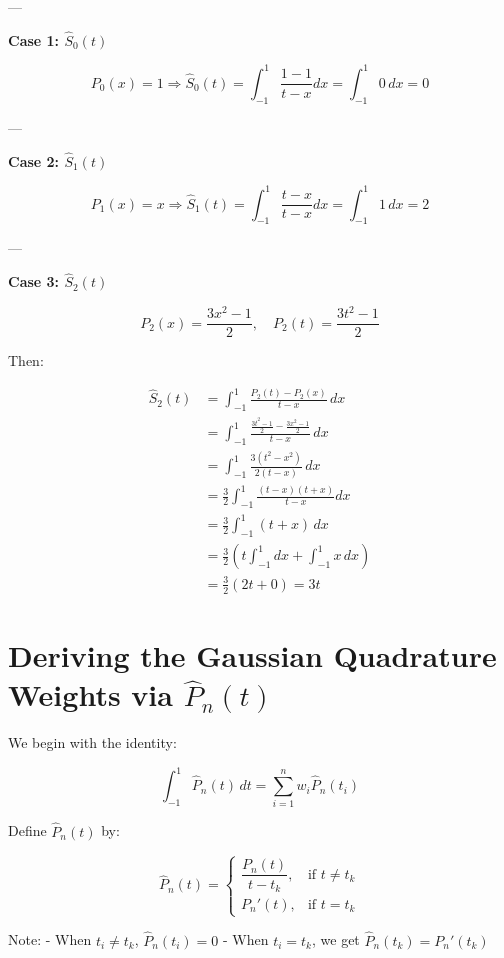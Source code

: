 \documentclass{article}
\begin{document}
---

\textbf{Case 1: \( \hat{S}_0(t) \)}

\[
P_0(x) = 1 \Rightarrow \hat{S}_0(t) = \int_{-1}^{1} \frac{1 - 1}{t - x} dx = \int_{-1}^{1} 0 \, dx = 0
\]

---

\textbf{Case 2: \( \hat{S}_1(t) \)}

\[
P_1(x) = x \Rightarrow \hat{S}_1(t) = \int_{-1}^{1} \frac{t - x}{t - x} dx = \int_{-1}^{1} 1 \, dx = 2
\]

---

\textbf{Case 3: \( \hat{S}_2(t) \)}

\[
P_2(x) = \frac{3x^2 - 1}{2}, \quad
P_2(t) = \frac{3t^2 - 1}{2}
\]

Then:

\begin{align*}
\hat{S}_2(t) &= \int_{-1}^{1} \frac{P_2(t) - P_2(x)}{t - x} \, dx \\
&= \int_{-1}^{1} \frac{ \frac{3t^2 - 1}{2} - \frac{3x^2 - 1}{2} }{t - x} \, dx \\
&= \int_{-1}^{1} \frac{3(t^2 - x^2)}{2(t - x)} \, dx \\
&= \frac{3}{2} \int_{-1}^{1} \frac{(t - x)(t + x)}{t - x} dx \\
&= \frac{3}{2} \int_{-1}^{1} (t + x) \, dx \\
&= \frac{3}{2} \left( t \int_{-1}^{1} dx + \int_{-1}^{1} x \, dx \right) \\
&= \frac{3}{2} (2t + 0) = 3t
\end{align*}


\section*{Deriving the Gaussian Quadrature Weights via $\hat{P}_n(t)$}

We begin with the identity:

\[
\int_{-1}^{1} \hat{P}_n(t) \, dt = \sum_{i=1}^{n} w_i \hat{P}_n(t_i)
\]

Define \( \hat{P}_n(t) \) by:

\[
\hat{P}_n(t) =
\begin{cases}
\dfrac{P_n(t)}{t - t_k}, & \text{if } t \ne t_k \\
P_n'(t), & \text{if } t = t_k
\end{cases}
\]

Note:
- When \( t_i \ne t_k \), \( \hat{P}_n(t_i) = 0 \)
- When \( t_i = t_k \), we get \( \hat{P}_n(t_k) = P_n'(t_k) \)
\end{document}

